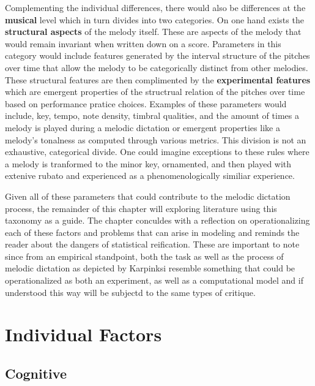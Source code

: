 \documentclass[]{book}
\theoremstyle{definition}
\theoremstyle{definition}
\theoremstyle{definition}
\theoremstyle{remark}
\begin{document}
Complementing the individual differences, there would also be
differences at the \textbf{musical} level which in turn divides into two
categories. On one hand exists the \textbf{structural aspects} of the
melody itself. These are aspects of the melody that would remain
invariant when written down on a score. Parameters in this category
would include features generated by the interval structure of the
pitches over time that allow the melody to be categorically distinct
from other melodies. These structural features are then complimented by
the \textbf{experimental features} which are emergent properties of the
structrual relation of the pitches over time based on performance
pratice choices. Examples of these parameters would include, key, tempo,
note density, timbral qualities, and the amount of times a melody is
played during a melodic dictation or emergent properties like a melody's
tonalness as computed through various metrics. This division is not an
exhaustive, categorical divide. One could imagine exceptions to these
rules where a melody is tranformed to the minor key, ornamented, and
then played with extenive rubato and experienced as a phenomenologically
similiar experience.

Given all of these parameters that could contribute to the melodic
dictation process, the remainder of this chapter will exploring
literature using this taxonomy as a guide. The chapter conculdes with a
reflection on operationalizing each of these factors and problems that
can arise in modeling and reminds the reader about the dangers of
statistical reification. These are important to note since from an
empirical standpoint, both the task as well as the process of melodic
dictation as depicted by Karpinksi resemble something that could be
operationalized as both an experiment, as well as a computational model
and if understood this way will be subjectd to the same types of
critique.

\hypertarget{individual-factors}{%
\section{Individual Factors}\label{individual-factors}}

\hypertarget{cognitive}{%
\subsection{Cognitive}\label{cognitive}}
\end{document}
